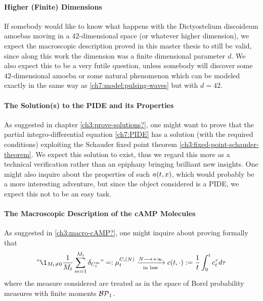 \paragraph{Higher (Finite) Dimensions}
If somebody would like to know what happens with the Dictyostelium discoideum amoebas moving in a $42$-dimensional space (or whatever higher dimension), we expect the macroscopic description proved in this master thesis to still be valid, since along this work the dimension was a finite dimensional parameter $d$. 
We also expect this to be a very futile question, unless somebody will discover some $42$-dimensional amoeba or some natural phenomenon which can be modeled exactly in the same way as \ref{ch7:model:pulsing-waves} but with $d=42$.

\paragraph{The Solution(s) to the PIDE and its Properties}
As suggested in chapter \ref{ch3:prove-solutions?}, one might want to prove that the partial integro-differential equation \ref{ch7:PIDE} has a solution (with the required conditions) exploiting the Schauder fixed point theorem \ref{ch3:fixed-point-schauder-theorem}.
We expect this solution to exist, thus we regard this more as a technical verification rather than an epiphany bringing brilliant new insights.
One might also inquire about the properties of such $a(t, x)$, which would probably be a more interesting adventure, but since the object considered is a PIDE, we expect this not to be an easy task.

\paragraph{The Macroscopic Description of the cAMP Molecules}
As suggested in \ref{ch3:macro-cAMP?}, one might inquire about proving formally that
\begin{equation*}
	"\1_{\hmactive_t \neq 0} \frac{1}{\hmactive_t}\sum_{m=1}^{\hmactive_t} \delta_{\camp_t^m} " =: \empmeas_t^{\camp,(N)} 
	\xrightarrow[\text{in law}]{N\longrightarrow +\infty} 
	\cdens(t,\cdot) :=
	\frac{1}{t}
	\int_0^t 
	\cdens_t^\tau 
	d \tau
\end{equation*}
where the measure considered are treated as \rv in the space of Borel probability measures with finite moments $\mathcal{BP}_1$.